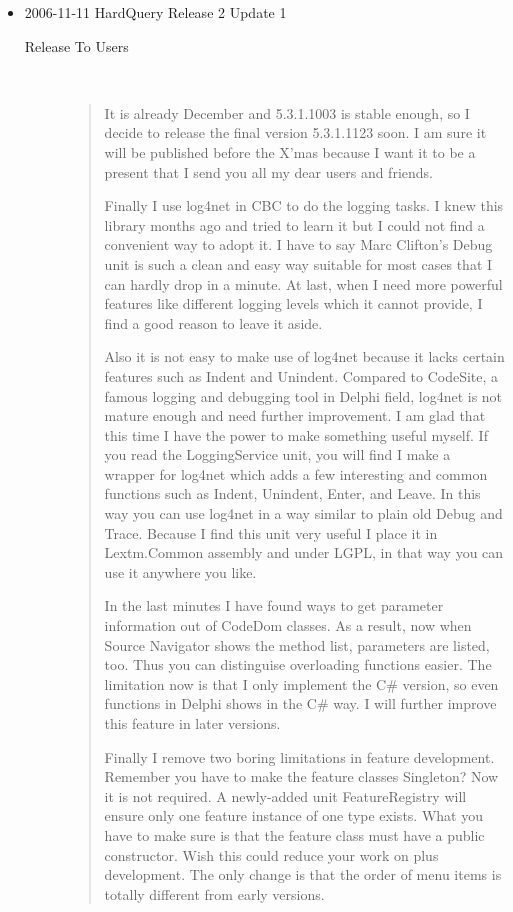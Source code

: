 \begin{itemize}
  \item 2006-11-11 HardQuery Release 2 Update 1
  \begin{description}
    \item[Release To Users] \
    \begin{quotation}
      It is already December and 5.3.1.1003 is stable enough, so I decide to
      release the final version 5.3.1.1123 soon. I am sure it will be published
      before the X'mas because I want it to be a present that I send you all my
      dear users and friends.

      Finally I use log4net in CBC to do the logging tasks. I knew this
      library months ago and tried to learn it but I could not find a
      convenient way to adopt it. I have to say Marc Clifton's Debug unit is
      such a clean and easy way suitable for most cases that I can hardly
      drop in a minute. At last, when I need more powerful features like
      different logging levels which it cannot provide, I find a good reason
      to leave it aside.

      Also it is not easy to make use of log4net because it lacks certain
      features such as Indent and Unindent. Compared to CodeSite, a famous
      logging and debugging tool in Delphi field, log4net is not mature
      enough and need further improvement. I am glad that this time I have
      the power to make something useful myself. If you read the
      LoggingService unit, you will find I make a wrapper for log4net which
      adds a few interesting and common functions such as Indent, Unindent,
      Enter, and Leave. In this way you can use log4net in a way similar to
      plain old Debug and Trace. Because I find this unit very useful I
      place it in Lextm.Common assembly and under LGPL, in that way you can
      use it anywhere you like.

      In the last minutes I have found ways to get parameter information out
      of CodeDom classes. As a result, now when Source Navigator shows the
      method list, parameters are listed, too. Thus you can distinguise
      overloading functions easier. The limitation now is that I only
      implement the C\# version, so even functions in Delphi shows in the
      C\# way. I will further improve this feature in later versions.

      Finally I remove two boring limitations in feature development.
      Remember you have to make the feature classes Singleton? Now it is not
      required. A newly-added unit FeatureRegistry will ensure only one
      feature instance of one type exists. What you have to make sure is
      that the feature class must have a public constructor. Wish this could
      reduce your work on plus development. The only change is that the
      order of menu items is totally different from early versions.


\end{quotation}
\end{description}
\end{itemize}
